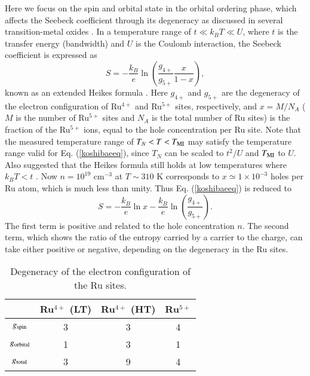 \documentclass[aps,twocolumn,showpacs,preprintnumbers,amsmath,amssymb,floats,citeautoscript,nobalancelastpage]{revtex4-1}
\begin{document}
Here we focus on the spin and orbital state in the orbital ordering phase,
which affects the Seebeck coefficient through its degeneracy
as discussed in several transition-metal oxides \cite{Terasaki1997,Palstra1997,Kobayashi2004}.
In a temperature range of $t\ll k_BT \ll U$, 
where $t$ is the transfer energy (bandwidth) and $U$ is the Coulomb interaction,
the Seebeck coefficient is expressed as 
\begin{equation}
S = -\frac{k_B}{e}\ln\left(\frac{g_{4+}}{g_{5+}}\frac{x}{1-x}\right),
\label{koshibaeeq}
\end{equation}
known as an extended Heikes formula \cite{Koshibae2000}.
Here $g_{4+}$ and $g_{5+}$ are the degeneracy of the electron configuration
of Ru$^{4+}$ and Ru$^{5+}$ sites, respectively, and 
$x = M/N_A$ ($M$ is the number of Ru$^{5+}$ sites and $N_A$ is the total number of Ru sites)
is the fraction of the Ru$^{5+}$ ions, 
equal to the hole concentration per Ru site.
Note that
the measured temperature range of $T_N < T < T_{\rm MI}$ may satisfy the temperature range valid for Eq. (\ref{koshibaeeq}),
since $T_N$ can be scaled to $t^2/U$ and $T_{\rm MI}$ to $U$.
Also suggested that the Heikes formula still holds at low temperatures where $k_BT < t$ \cite{Palsson1998}.
Now $n = 10^{19}$ cm$^{-3}$ at $T \sim 310$ K
corresponds to 
$x \simeq 1\times 10^{-3}$ holes per Ru atom,
which is much less than unity. Thus Eq. (\ref{koshibaeeq}) is reduced to
\begin{equation}
S = -\frac{k_B}{e}\ln x -\frac{k_B}{e}\ln\left(\frac{g_{4+}}{g_{5+}}\right).
\label{koshibaeeqa}
\end{equation}
The first term is positive and related to the hole concentration $n$.
The second term, which shows the ratio of the entropy carried by a carrier to the charge,
can take either positive or negative, depending on the degeneracy in the Ru sites.

\begin{table}[b]
\caption{\label{table1} 
Degeneracy of the electron configuration of the Ru sites.}
\begin{ruledtabular}
\begin{tabular}{cccc}
  & Ru$^{4+}$ (LT) & Ru$^{4+}$ (HT) & Ru$^{5+}$ \\
\hline
$g_{\rm spin}$  & 3 & 3 & 4\\
$g_{\rm orbital}$ & 1 & 3 & 1\\
$g_{\rm total}$ & 3 & 9 & 4\\
\end{tabular}
\end{ruledtabular}
\end{table}
\end{document}
